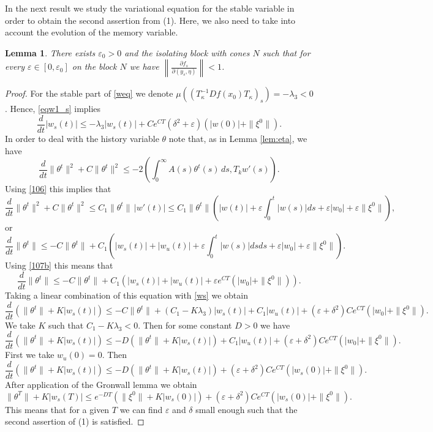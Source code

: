 \documentclass[11pt, leqno]{amsart}
\newtheorem{lem}[thm]{Lemma}
\theoremstyle{definition}
\begin{document}
In the next result we study the variational equation for the stable variable in order to obtain the second assertion from (1). Here, we also need to take into account the evolution of the memory variable.
\begin{lem}
	There exists $\varepsilon_0>0$ and the isolating block with cones  $N$ such that for every $\varepsilon\in [0,\varepsilon_0]$ on the block $N$ we have $\left\|\frac{\partial f_s}{\partial (y_s,\eta)}\right\| < 1$.
\end{lem}
\begin{proof}
For the stable part of \eqref{weq} we denote $\mu\left((T_\kappa^{-1}D f(x_0) T_\kappa)_s\right) = - \lambda_3 < 0$. Hence, \eqref{eqw1_s} implies
\begin{equation}\label{ws}
\frac{d}{dt}|w_s(t)| \leq - \lambda_3 | w_s(t)| + Ce^{CT}(\delta^2+\varepsilon)(|w(0)|+\|\xi^0\|).
\end{equation}
In order to deal with the history variable $\theta$ note that, as in Lemma \ref{lem:eta}, we have
$$
\frac{d}{dt}\|\theta ^t\|^2+C\|\theta^t\|^2 \leq -2\left(\int_0^\infty A(s)\theta^t(s)\, ds,T_kw'(s)\right).
$$
Using \eqref{106} this implies that
$$
\frac{d}{dt}\|\theta ^t\|^2+C\|\theta^t\|^2 \leq C_1\|\theta^t\|\, |w'(t)| \leq C_1\|\theta^t\| \left(|w(t)|+\varepsilon\int_0^t|w(s)| ds+\varepsilon|w_0|+\varepsilon\|\xi^0\|\right),
$$
or
$$
\frac{d}{dt}\|\theta ^t\|\leq - C\|\theta^t\|+ C_1 \left(|w_s(t)|+|w_u(t)|+\varepsilon\int_0^t|w(s)| ds ds+\varepsilon|w_0|+\varepsilon\|\xi^0\|\right).
$$
Using \eqref{107b} this means that
$$
\frac{d}{dt}\|\theta ^t\|\leq - C\|\theta^t\|+ C_1 \left(|w_s(t)|+|w_u(t)|+\varepsilon e^{CT}(|w_0|+\|\xi^0\|)\right). $$
Taking a linear combination of this equation with \eqref{ws} we obtain
$$
\frac{d}{dt}(\|\theta ^t\|+K|w_s(t)|)\leq - C\|\theta^t\|+ (C_1-K\lambda_3)|w_s(t)|+C_1|w_u(t)|+(\varepsilon+\delta^2) Ce^{CT}(|w_0|+\|\xi^0\|). $$
We take $K$ such that $C_1-K\lambda_3<0$. Then for some constant $D>0$ we have
$$
\frac{d}{dt}(\|\theta ^t\|+K|w_s(t)|)\leq - D(\|\theta^t\|+ K|w_s(t)|)+C_1|w_u(t)|+(\varepsilon+\delta^2) Ce^{CT}(|w_0|+\|\xi^0\|). $$
First we take $w_u(0)=0$. Then
$$
\frac{d}{dt}(\|\theta ^t\|+K|w_s(t)|)\leq - D(\|\theta^t\|+ K|w_s(t)|)+(\varepsilon+\delta^2) Ce^{CT}(|w_s(0)|+\|\xi^0\|). $$
After application of the Gronwall lemma we obtain
$$
\|\theta ^T\|+K|w_s(T)|\leq e^{-DT}(\|\xi^0\|+K|w_s(0)|)+(\varepsilon+\delta^2) Ce^{CT}(|w_s(0)|+\|\xi^0\|).
$$
This means that for a given $T$ we can find $\varepsilon$ and $\delta$ small enough such that the second assertion of (1) is satisfied.
\end{proof}
\end{document}

